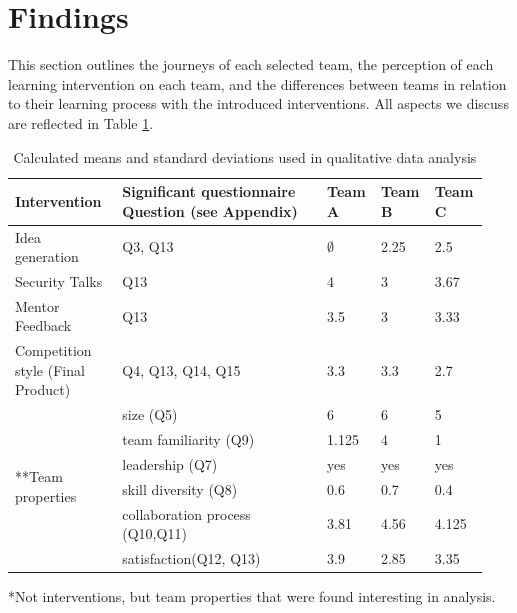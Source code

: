 \documentclass[runningheads]{llncs}
\begin{document}
\section{Findings}
This section outlines the journeys of each selected team, the perception of each learning intervention on each team, and the differences between teams in relation to their learning process with the introduced interventions. All aspects we discuss are reflected in Table \ref{tab:teambinter}.
\begin{table}[h]
    \caption{Calculated means and standard deviations used in qualitative data analysis}
    \label{tab:teambinter}
    \begin{tabular}{|p{0.22\linewidth}|p{0.42\linewidth}|p{0.1\linewidth}|p{0.1\linewidth}|p{0.1\linewidth}|}\hline
	Intervention & Significant \newline questionnaire Question (see Appendix) &  Team A & Team B & Team C \\ \hline
	Idea generation & Q3, Q13 & $\emptyset$ & 2.25 & 2.5  \\ \hline
	Security Talks  & Q13 &  4 & 3 & 3.67   \\ \hline
	Mentor Feedback  & Q13 &  3.5 & 3 & 3.33 \\ \hline
	Competition style \newline (Final Product) & Q4, Q13, Q14, Q15 & 3.3 & 3.3 & 2.7   \\ \hline
	\multirow{8}{*}{**Team properties} & size (Q5) & 6 & 6 & 5  \\\cline{2-5}
	& team familiarity (Q9) & 1.125 & 4 & 1  \\ \cline{2-5}
	& leadership (Q7) & yes & yes & yes  \\ \cline{2-5}
	& skill diversity (Q8) & 0.6 & 0.7 & 0.4  \\ \cline{2-5}
	& collaboration process (Q10,Q11) & 3.81 & 4.56 & 4.125  \\ \cline{2-5}
	& satisfaction(Q12, Q13) & 3.9 & 2.85 & 3.35  \\ \hline
    \end{tabular}
    *Not interventions, but team properties that were found interesting in analysis.
\end{table}
\end{document}
